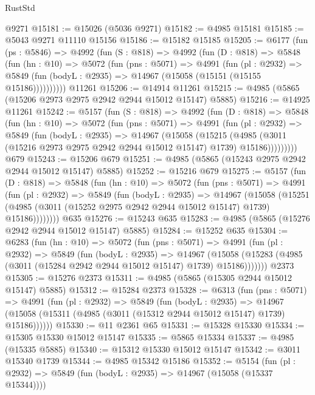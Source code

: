 \begin{lexlean}{RustStd}
\begin{coremodule}
    @9271
@15181 := @15026 (@5036 @9271)
@15182 := @4985 @15181
@15185 := @5043 @9271 @11110 @15156
@15186 := @15182 @15185
@15205 := @6177
    (fun (ps : @5846) =>
    @4992
      (fun (S : @818) =>
      @4992
        (fun (D : @818) =>
        @5848
          (fun (hn : @10) =>
          @5072
            (fun (pns : @5071) =>
            @4991
              (fun (pl : @2932) =>
              @5849 (fun (bodyL : @2935) => @14967 (@15058 (@15151 (@15155 @15186))))))))))
    @11261
@15206 := @14914 @11261
@15215 := @4985 (@5865 (@15206 @2973 @2975 @2942 @2944 @15012 @15147) @5885)
@15216 := @14925 @11261
@15242 := @5157
    (fun (S : @818) =>
    @4992
      (fun (D : @818) =>
      @5848
        (fun (hn : @10) =>
        @5072
          (fun (pns : @5071) =>
          @4991
            (fun (pl : @2932) =>
            @5849
              (fun (bodyL : @2935) =>
              @14967
                (@15058
                  (@15215
                    (@4985
                      (@3011 (@15216 @2973 @2975 @2942 @2944 @15012 @15147) @1739)
                      @15186)))))))))
    @679
@15243 := @15206 @679
@15251 := @4985 (@5865 (@15243 @2975 @2942 @2944 @15012 @15147) @5885)
@15252 := @15216 @679
@15275 := @5157
    (fun (D : @818) =>
    @5848
      (fun (hn : @10) =>
      @5072
        (fun (pns : @5071) =>
        @4991
          (fun (pl : @2932) =>
          @5849
            (fun (bodyL : @2935) =>
            @14967
              (@15058
                (@15251 (@4985 (@3011 (@15252 @2975 @2942 @2944 @15012 @15147) @1739) @15186))))))))
    @635
@15276 := @15243 @635
@15283 := @4985 (@5865 (@15276 @2942 @2944 @15012 @15147) @5885)
@15284 := @15252 @635
@15304 := @6283
    (fun (hn : @10) =>
    @5072
      (fun (pns : @5071) =>
      @4991
        (fun (pl : @2932) =>
        @5849
          (fun (bodyL : @2935) =>
          @14967
            (@15058 (@15283 (@4985 (@3011 (@15284 @2942 @2944 @15012 @15147) @1739) @15186)))))))
    @2373
@15305 := @15276 @2373
@15311 := @4985 (@5865 (@15305 @2944 @15012 @15147) @5885)
@15312 := @15284 @2373
@15328 := @6313
    (fun (pns : @5071) =>
    @4991
      (fun (pl : @2932) =>
      @5849
        (fun (bodyL : @2935) =>
        @14967 (@15058 (@15311 (@4985 (@3011 (@15312 @2944 @15012 @15147) @1739) @15186))))))
@15330 := @11 @2361 @65
@15331 := @15328 @15330
@15334 := @15305 @15330 @15012 @15147
@15335 := @5865 @15334
@15337 := @4985 (@15335 @5885)
@15340 := @15312 @15330 @15012 @15147
@15342 := @3011 @15340 @1739
@15344 := @4985 @15342 @15186
@15352 := @5154
    (fun (pl : @2932) => @5849 (fun (bodyL : @2935) => @14967 (@15058 (@15337 @15344))))

\end{coremodule}
\end{lexlean}
